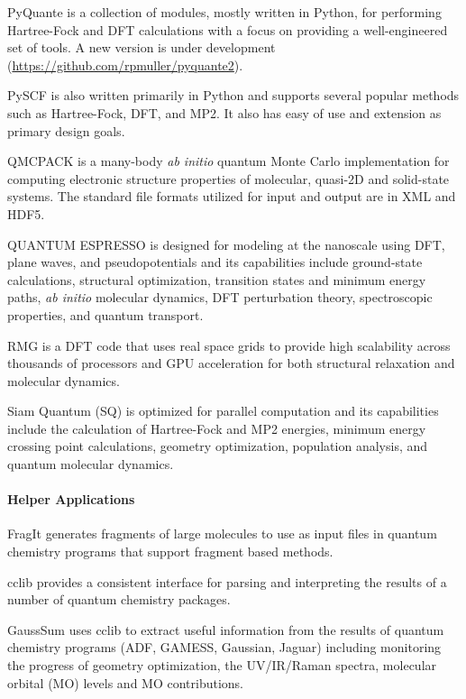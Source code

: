 PyQuante is a collection of modules, mostly written in Python, for performing Hartree-Fock and DFT calculations with a focus on providing a well-engineered set of tools. A new version is under development (\url{https://github.com/rpmuller/pyquante2}).

PySCF is also written primarily in Python and supports several popular methods such as Hartree-Fock, DFT, and MP2. It also has easy of use and extension as primary design goals.

QMCPACK \cite{kim2010quantum} is a many-body \textit{ab initio} quantum Monte Carlo implementation for computing electronic structure properties of molecular, quasi-2D and solid-state systems. The standard file formats utilized for input and output are in XML and HDF5.

QUANTUM ESPRESSO \cite{Giannozzi_2009} is designed for modeling at the nanoscale using DFT, plane waves, and pseudopotentials and its capabilities include ground-state calculations, structural optimization, transition states and minimum energy paths, \textit{ab initio} molecular dynamics, DFT perturbation theory, spectroscopic properties, and quantum transport.

RMG \cite{moore2012scaling} is a DFT code that uses real space grids to provide high scalability across thousands of processors and GPU acceleration for both structural relaxation and molecular dynamics.

Siam Quantum (SQ) is optimized for parallel computation and its capabilities include the calculation of Hartree-Fock and MP2 energies, minimum energy crossing point calculations, geometry optimization, population analysis, and quantum molecular dynamics.


\paragraph{Helper Applications}
FragIt \cite{Steinmann_2012} generates fragments of large molecules to use as input files in quantum chemistry programs that support fragment based methods.

cclib \cite{O_boyle_2008} provides a consistent interface for parsing and interpreting the results of a number of quantum chemistry packages. 

GaussSum \cite{O_boyle_2008} uses cclib to extract useful information from the results of quantum chemistry programs (ADF, GAMESS, Gaussian, Jaguar) including monitoring the progress of geometry optimization, the UV/IR/Raman spectra, molecular orbital (MO) levels and MO contributions.

